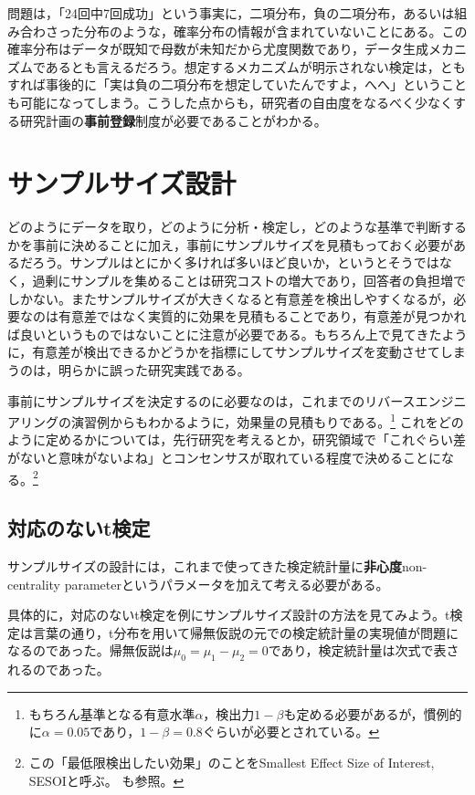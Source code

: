\documentclass[
  a4paper,
]{ltjsbook}
\begin{document}
問題は，「24回中7回成功」という事実に，二項分布，負の二項分布，あるいは組み合わさった分布のような，確率分布の情報が含まれていないことにある。この確率分布はデータが既知で母数が未知だから尤度関数であり，データ生成メカニズムであるとも言えるだろう。想定するメカニズムが明示されない検定は，ともすれば事後的に「実は負の二項分布を想定していたんですよ，へへ」ということも可能になってしまう。こうした点からも，研究者の自由度をなるべく少なくする研究計画の\textbf{事前登録}制度が必要であることがわかる。

\section{サンプルサイズ設計}\label{ux30b5ux30f3ux30d7ux30ebux30b5ux30a4ux30baux8a2dux8a08}

どのようにデータを取り，どのように分析・検定し，どのような基準で判断するかを事前に決めることに加え，事前にサンプルサイズを見積もっておく必要があるだろう。サンプルはとにかく多ければ多いほど良いか，というとそうではなく，過剰にサンプルを集めることは研究コストの増大であり，回答者の負担増でしかない。またサンプルサイズが大きくなると有意差を検出しやすくなるが，必要なのは有意差ではなく実質的に効果を見積もることであり，有意差が見つかれば良いというものではないことに注意が必要である。もちろん上で見てきたように，有意差が検出できるかどうかを指標にしてサンプルサイズを変動させてしまうのは，明らかに誤った研究実践である。

事前にサンプルサイズを決定するのに必要なのは，これまでのリバースエンジニアリングの演習例からもわかるように，効果量の見積もりである。\footnote{もちろん基準となる有意水準\(\alpha\)，検出力\(1-\beta\)も定める必要があるが，慣例的に\(\alpha = 0.05\)であり，\(1-\beta =0.8\)ぐらいが必要とされている。}
これをどのように定めるかについては，先行研究を考えるとか，研究領域で「これぐらい差がないと意味がないよね」とコンセンサスが取れている程度で決めることになる。\footnote{この「最低限検出したい効果」のことをSmallest
  Effect Size of Interest, SESOIと呼ぶ。\textcite{kosugi2023} も参照。}

\subsection{対応のないt検定}\label{ux5bfeux5fdcux306eux306aux3044tux691cux5b9a}

サンプルサイズの設計には，これまで使ってきた検定統計量に\textbf{非心度}non-centrality
parameterというパラメータを加えて考える必要がある。

具体的に，対応のないt検定を例にサンプルサイズ設計の方法を見てみよう。t検定は言葉の通り，t分布を用いて帰無仮説の元での検定統計量の実現値が問題になるのであった。帰無仮説は\(\mu_0 = \mu_1-\mu_2 = 0\)であり，検定統計量は次式で表されるのであった。
\end{document}
